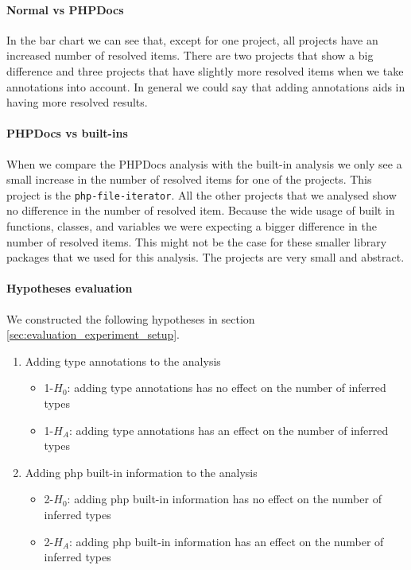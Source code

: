 \documentclass[../main.tex]{subfiles}
\begin{document}
	\paragraph{Normal vs PHPDocs}
	In the bar chart we can see that, except for one project, all projects have an increased number of resolved items.
	There are two projects that show a big difference and three projects that have slightly more resolved items when we take annotations into account.
	In general we could say that adding annotations aids in having more resolved results.
	
	\paragraph{PHPDocs vs built-ins}
	When we compare the PHPDocs analysis with the built-in analysis we only see a small increase in the number of resolved items for one of the projects.
	This project is the \texttt{php-file-iterator}.
	All the other projects that we analysed show no difference in the number of resolved item.
	Because the wide usage of built in functions, classes, and variables we were expecting a bigger difference in the number of resolved items.
	This might not be the case for these smaller library packages that we used for this analysis.
	The projects are very small and abstract.
	
	\paragraph{Hypotheses evaluation}
	We constructed the following hypotheses in section \ref{sec:evaluation_experiment_setup}.
	
	\begin{enumerate}
		\item Adding type annotations to the analysis
		\begin{itemize}
			\item 1-$H_0$: adding type annotations has no effect on the number of inferred types
			\item 1-$H_A$: adding type annotations has an effect on the number of inferred types
		\end{itemize}		
		\item Adding php built-in information to the analysis 
		\begin{itemize}
			\item 2-$H_0$: adding php built-in information has no effect on the number of inferred types
			\item 2-$H_A$: adding php built-in information has an effect on the number of inferred types	
		\end{itemize}
	\end{enumerate}
	
\end{document}
